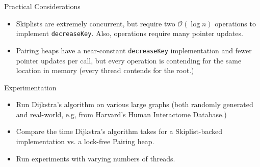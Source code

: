 \documentclass{beamer}
\begin{document}
\begin{frame}{Practical Considerations}
  \begin{itemize}
    \item Skiplists are extremely concurrent, but require
      two $\mathcal{O}(\log n)$ operations to implement \texttt{decreaseKey}. Also,
      operations require many pointer updates.
    \item Pairing heaps have a near-constant \texttt{decreaseKey} implementation and fewer
      pointer updates per call, but
      every operation is contending for the same location in memory (every thread contends for the root.)
  \end{itemize}
\end{frame}

\begin{frame}{Experimentation}
  \begin{itemize}
    \item Run Dijkstra's algorithm on various large graphs
      (both randomly generated and real-world, e.g, from Harvard's Human Interactome Database.)
    \item Compare the time Dijkstra's algorithm takes for a Skiplist-backed implementation vs. a lock-free Pairing heap.
    \item Run experiments with varying numbers of threads.
  \end{itemize}
\end{frame}
\end{document}
